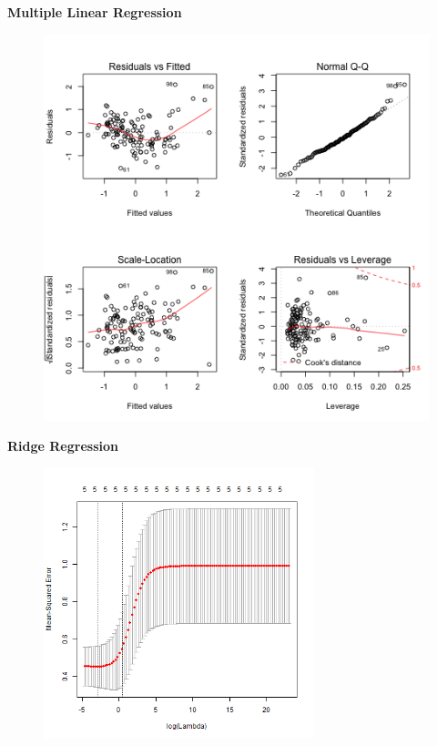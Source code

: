 \documentclass{article}
\begin{document}
\noindent \textbf{Multiple Linear Regression}\newline

\begin{figure}[H]
\includegraphics[width=1\textwidth]{../images/lm_top.png}
\end{figure}

\clearpage

\noindent \textbf{Ridge Regression} \newline

\begin{figure}[H]
\includegraphics[width=0.7\textwidth]{../images/ridgeCV_top.png}
\end{figure}
\end{document}
